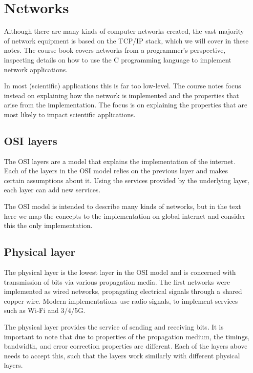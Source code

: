 \chapter{Networks}

Although there are many kinds of computer networks created, the vast majority of network equipment is based on the TCP/IP stack, which we will cover in these notes. The course book covers networks from a programmer’s perspective, inspecting details on how to use the C programming language to implement network applications.

In most (scientific) applications this is far too low-level. The course notes focus instead on explaining how the network is implemented and the properties that arise from the implementation. The focus is on explaining the properties that are most likely to impact scientific applications.

\section{OSI layers}
The OSI layers are a model that explains the implementation of the internet. Each of the layers in the OSI model relies on the previous layer and makes certain assumptions about it. Using the services provided by the underlying layer, each layer can add new services.

The OSI model is intended to describe many kinds of networks, but in the text here we map the concepts to the implementation on global internet and consider this the only implementation.

\section{Physical layer}
The physical layer is the lowest layer in the OSI model and is concerned with transmission of bits via various propagation media. The first networks were implemented as wired networks, propagating electrical signals through a shared copper wire. Modern implementations use radio signals, to implement services such as Wi-Fi and 3/4/5G. 

The physical layer provides the service of sending and receiving bits. It is important to note that due to properties of the propagation medium, the timings, bandwidth, and error correction properties are different. Each of the layers above needs to accept this, such that the layers work similarly with different physical layers.

